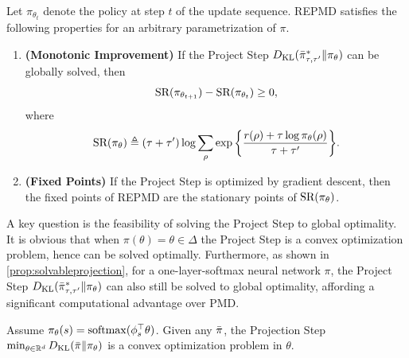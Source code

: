 \begin{thm}
\label{thm:monotonically_increasing_sr_property}
Let $\pi_{\theta_{t}}$ denote the policy at step $t$ of the update
sequence.
REPMD satisfies the following properties for an arbitrary parametrization of $\pi$.
\begin{enumerate}
	\item {\bf (Monotonic Improvement)} 
	If the Project Step $D_{\mathrm{KL}}( \bar{\pi}_{\tau,\tau^{\prime}}^* \| \pi_\theta )$ can be globally solved,
then 
	\begin{equation*}
	\text{SR}(\pi_{\theta_{t+1}}) - \text{SR}(\pi_{\theta_t})\ge 0,
	\end{equation*}
	where
	{\small
	\begin{equation}
	\label{eq:SR}
	\text{SR}(\pi_\theta) \triangleq (\tau + \tau^{\prime})\log{ \sum_{\rho}{ \exp\left\{ \frac{r(\rho) + \tau \log{\pi_\theta(\rho)} }{\tau + \tau^{\prime}} \right\} }}.
	\end{equation}
	}
	\item {\bf (Fixed Points)} If the Project Step is optimized by gradient descent, then the fixed points of REPMD are the 
	stationary points of $\text{SR}(\pi_\theta)$. 
\end{enumerate}
\end{thm}

A key question is the feasibility of solving the
Project Step to global optimality.
It is obvious that when $\pi(\theta) = \theta \in \Delta$
the Project Step is a convex optimization problem,
hence can be solved optimally.
Furthermore, as shown in \cref{prop:solvableprojection}, 
for a one-layer-softmax neural network $\pi$,
the Project Step $D_{\mathrm{KL}}( \bar{\pi}_{\tau,\tau^{\prime}}^* \| \pi_\theta)$
can also still be solved to global optimality,
affording a significant computational advantage over PMD.

\begin{prop}
\label{prop:solvableprojection}
Assume $\pi_\theta(s) = \mathrm{softmax}(\phi_s^{\top}\theta)$.
Given any $\bar{\pi}$,
the Projection Step
$\min\nolimits_{\theta \in \mathbb{R}^d}{D_{\mathrm{KL}}(\bar{\pi} \| \pi_\theta)}$
is a convex optimization problem in $\theta$.
\end{prop}

